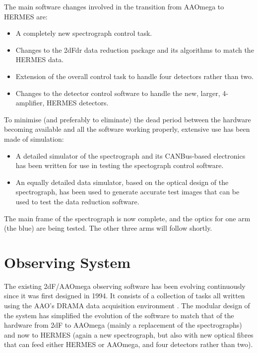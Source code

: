 The main software changes involved in the transition from AAOmega to HERMES are:

\begin{itemize}
\itemsep0em
\item A completely new spectrograph control task.
\item Changes to the 2dFdr data reduction package and its algorithms to match the HERMES data.
\item Extension of the overall control task to handle four detectors rather than two.
\item Changes to the detector control software to handle the new, larger, 4-amplifier, HERMES detectors.
\end{itemize}

To minimise (and preferably to eliminate) the dead period between the hardware becoming available and all the software working properly, extensive use has been made of simulation:

\begin{itemize}
\itemsep0em
\item A detailed simulator of the spectrograph and its CANBus-based electronics has been written for use in testing the spectograph control software.
\item An equally detailed data simulator, based on the optical design of the spectrograph, has been used to generate accurate test images that can be used to  test the data reduction software.
\end{itemize}

The main frame of the spectrograph is now complete, and the optics for one arm (the blue) are being tested. The other three arms will follow shortly.

\section{Observing System}

The existing 2dF/AAOmega observing software has been evolving continuously since it was first designed in 1994. It consists of a collection of tasks all written using the AAO's DRAMA data acquisition environment \citep{Drama_1995}. The modular design of the system has simplified the evolution of the software to match that of the hardware from 2dF to AAOmega (mainly a replacement of the spectrographs) and now to HERMES (again a new spectrograph, but also with new optical fibres that can feed either HERMES or AAOmega, and four detectors rather than two).

